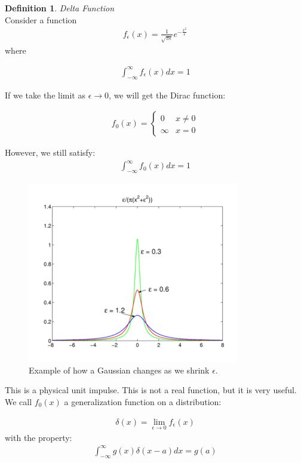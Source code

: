 \documentclass{article}
\theoremstyle{definition}
\newtheorem{definition}{Definition}[section]
\newcommand{\Def}[2]{
\begin{shaded*}
\begin{definition}{\textit{#1}}\\#2\end{definition}
\end{shaded*}
}
\begin{document}
\Def{Delta Function}{
Consider a function 
\begin{align*}
f_\epsilon(x) = \frac{1}{\sqrt{\pi \epsilon }} e^{-\frac{x^2}{\epsilon}}
\end{align*}
where

\begin{align*}
 \int_{-\infty}^{\infty} f_\epsilon(x)  dx = 1
\end{align*}

If we take the limit as $\epsilon \to 0$, we will get the Dirac function:

\begin{align*}
f_0(x) = \begin{cases}
0 & x \neq 0\\
\infty & x = 0 
\end{cases}
\end{align*}

However, we still satisfy:
\begin{align*}
\int_{-\infty}^{\infty} f_0(x)  dx = 1
\end{align*}



\begin{figure}[H]
	\centering
	\includegraphics[width=0.7\linewidth]{eps_dirac}
	\caption{Example of how a Gaussian changes as we shrink $\epsilon$. }
	\label{fig:epsdirac}
\end{figure}

This is a physical unit impulse. This is not a real function, but it is very useful. We call $f_0(x)$ a generalization function on a distribution:

\begin{align*}
\delta(x) = \lim_{\epsilon \to 0} f_\epsilon(x)
\end{align*}
with the property:
\begin{align*}
\int_{-\infty}^{\infty} g(x) \delta(x-a)  dx = g(a)
\end{align*}

}
\end{document}
